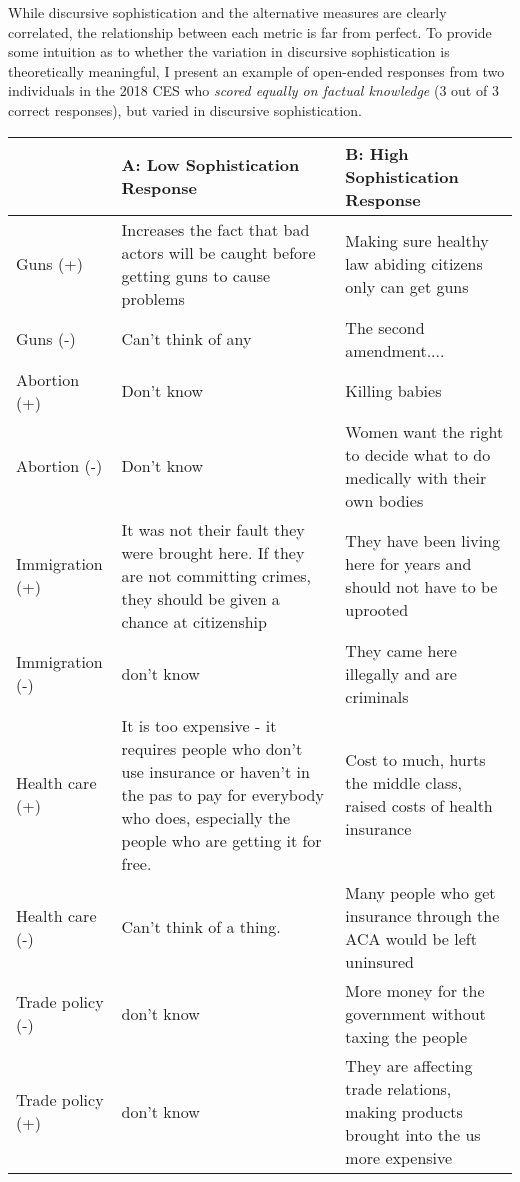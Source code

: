 While discursive sophistication and the alternative measures are clearly correlated, the relationship between each metric is far from perfect. To provide some intuition as to whether the variation in discursive sophistication is theoretically meaningful, I present an example of open-ended responses from two individuals in the 2018 CES who \textit{scored equally on factual knowledge} (3 out of 3 correct responses), but varied in discursive sophistication. 

\begin{table}[ht]\footnotesize\centering
\begin{tabular}{l|p{6.8cm}|p{5.8cm}}
\toprule
					& A: Low Sophistication Response 
					& B: High Sophistication Response
					\\\midrule
Guns (+)			& Increases the fact that bad actors will be caught before getting guns to cause problems
					& Making sure healthy law abiding citizens only can get guns
					\\\hdashline
Guns (-)			& Can't think of any
					& The second amendment....
					\\\hdashline
Abortion (+)		& Don't know
					& Killing babies
					\\\hdashline
Abortion (-)		& Don't know
					& Women want the right to decide what to do medically with their own bodies
					\\\hdashline
Immigration (+)		& It was not their fault they were brought here. If they are not committing crimes, they should be given a chance at citizenship
					& They have been living here for years and should not have to be uprooted
					\\\hdashline
Immigration (-)		& don't know
					& They came here illegally and are criminals
					\\\hdashline
Health care (+)		& It is too expensive - it requires people who don't use insurance or haven't in the pas to pay for everybody who does, especially the people who are getting it for free.
					& Cost to much, hurts the middle class, raised costs of health insurance
					\\\hdashline
Health care (-)		& Can't think of a thing.
					& Many people who get insurance through the ACA would be left uninsured
					\\\hdashline
Trade policy (-)	& don't know
					& More money for the government without taxing the people
					\\\hdashline
Trade policy (+)	& don't know
					& They are affecting trade relations, making products brought into the us more expensive

\end{tabular}
\end{table}
